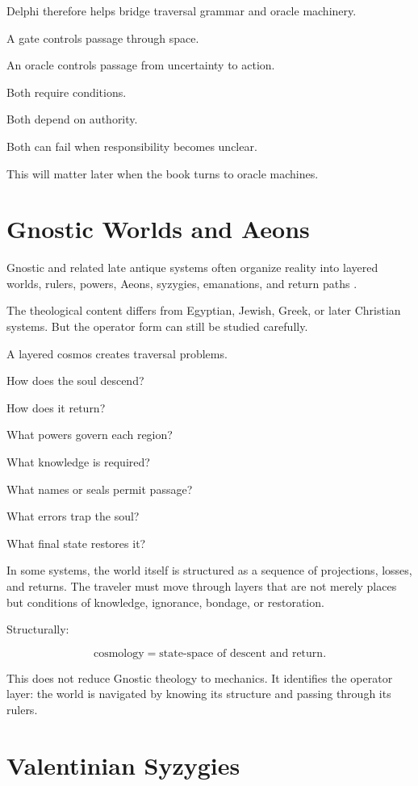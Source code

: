 \documentclass[11pt]{book}
\begin{document}
Delphi therefore helps bridge traversal grammar and oracle machinery.

A gate controls passage through space.

An oracle controls passage from uncertainty to action.

Both require conditions.

Both depend on authority.

Both can fail when responsibility becomes unclear.

This will matter later when the book turns to oracle machines.

\section{Gnostic Worlds and Aeons}

Gnostic and related late antique systems often organize reality into layered worlds, rulers, powers, Aeons, syzygies, emanations, and return paths \cite{Jonas1963GnosticReligion,Pagels1979GnosticGospels}.

The theological content differs from Egyptian, Jewish, Greek, or later Christian systems. But the operator form can still be studied carefully.

A layered cosmos creates traversal problems.

How does the soul descend?

How does it return?

What powers govern each region?

What knowledge is required?

What names or seals permit passage?

What errors trap the soul?

What final state restores it?

In some systems, the world itself is structured as a sequence of projections, losses, and returns. The traveler must move through layers that are not merely places but conditions of knowledge, ignorance, bondage, or restoration.

Structurally:

\[
\text{cosmology} = \text{state-space of descent and return}.
\]

This does not reduce Gnostic theology to mechanics. It identifies the operator layer: the world is navigated by knowing its structure and passing through its rulers.

\section{Valentinian Syzygies}
\end{document}
